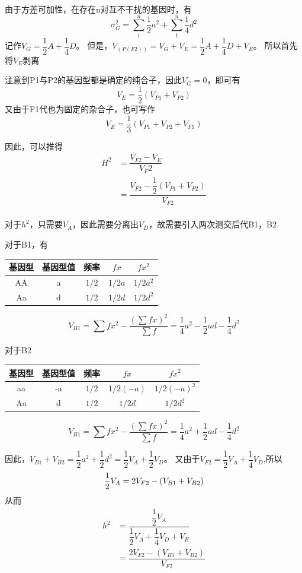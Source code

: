 \documentclass[a4paper, 12pt]{report}
\begin{document}
  由于方差可加性，在存在n对互不干扰的基因时，有$$\sigma_G^2=\sum_{1}^{n}\dfrac{1}{2}a^2+\sum_{1}^{n}\dfrac{1}{4}d^2$$
  记作\(V_G=\dfrac{1}{2}A+\dfrac{1}{4}D\)。
  但是，$V_{(P(F2))}=V_G+V_E=\dfrac{1}{2}A+\dfrac{1}{4}D+V_E$。
  所以首先将\(V_E\)剥离

  注意到P1与P2的基因型都是确定的纯合子，因此\(V_G=0\)，即可有
  \[V_E=\dfrac{1}{2}(V_{P1}+V_{P2})\]
  又由于F1代也为固定的杂合子，也可写作
  \[V_E=\dfrac{1}{3}(V_{P1}+V_{P2}+V_{F1})\]
  
  因此，可以推得
  \[
    \begin{aligned}
      H^2&=\dfrac{V_{F2}-V_E}{V_F2}\\
      &=\dfrac{V_{F2}-\dfrac{1}{2}(V_{P1}+V_{P2})}{V_{F2}}\\
    \end{aligned}
  \]

  对于\(h^2\)，只需要$V_A$，因此需要分离出$V_D$，故需要引入两次测交后代B1，B2

  对于B1，有
  \begin{center}
    \begin{tabular}{ccccc}
      基因型&基因型值&频率&$fx$&$fx^2$\\
      \hline
      AA&a&$1/2$&$1/2a$&$1/2a^2$\\
      Aa&d&$1/2$&$1/2d$&$1/2d^2$\\
    \end{tabular}
  \end{center}
  \[
    V_{B1}=\sum fx^2-\dfrac{(\sum fx)^2}{\sum f}=\dfrac{1}{4}a^2-\dfrac{1}{2}ad-\dfrac{1}{4}d^2
  \]

  对于B2
  \begin{center}
    \begin{tabular}{ccccc}
      基因型&基因型值&频率&$fx$&$fx^2$\\
      \hline
      aa&-a&$1/2$&$1/2(-a)$&$1/2(-a)^2$\\
      Aa&d&$1/2$&$1/2d$&$1/2d^2$\\
    \end{tabular}
  \end{center}
  \[
    V_{B1}=\sum fx^2-\dfrac{(\sum fx)^2}{\sum f}=\dfrac{1}{4}a^2+\dfrac{1}{2}ad-\dfrac{1}{4}d^2
  \]

  因此，\(V_{B1}+V_{B2}=\dfrac{1}{2}a^2+\dfrac{1}{2}d^2=\dfrac{1}{2}V_A+\dfrac{1}{2}V_D\)。
  又由于\(V_{F2}=\dfrac{1}{2}V_A+\dfrac{1}{4}V_D\),所以
  \[
      \dfrac{1}{2}V_A=2V_{F2}-(V_{B1}+V_{B2})\\
  \]
  从而
  \[
    \begin{aligned}
      h^2&=\dfrac{\dfrac{1}{2}V_A}{\dfrac{1}{2}V_A+\dfrac{1}{4}V_D+V_E}\\
      &=\dfrac{2V_{F2}-(V_{B1}+V_{B2})}{V_{F2}}\\
    \end{aligned}
  \]
\end{document}
